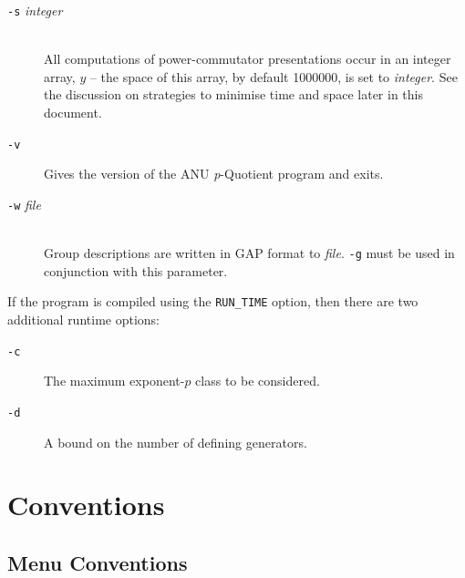 \documentclass[12pt]{article}
\begin{document}
\begin{description}
\item[\texttt{-s} {\it integer}]\ \\
      All computations of power-commutator presentations occur
      in an integer array, $y$ -- the space of this array,  by 
      default 1000000, is set to {\em integer}. See the discussion
      on strategies to minimise time and space later in this document.

\item[\texttt{-v}\hspace*{1em}]
      Gives the version of the ANU {\it p}-Quotient program and exits.

\item[\texttt{-w} {\it file}]\ \\
      Group descriptions are written in {\sf GAP} 
      format to {\em file}. \texttt{-g}
      must be used in conjunction with this parameter.

\end{description}

If the program is compiled using the \texttt{RUN\_TIME} option, then
there are two additional runtime options:

\begin{description}

\item[\texttt{-c}\hspace*{1em}]
The maximum exponent-$p$ class to be considered.

\item[\texttt{-d}\hspace*{1em}]
A bound on the number of defining generators.

\end{description}

\pagebreak
\section{Conventions}\label{sec:conventions}
\subsection{Menu Conventions}
\end{document}
